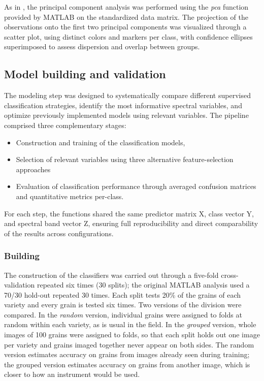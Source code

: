 \documentclass[final,5p,times,twocolumn]{elsarticle}
\newcommand{\added}[1]{{\color{blue}#1}}
\begin{document}
\added{As in} \citet{amigo2013,zhang2022,ali2024}\added{,} the principal component analysis was performed using the \emph{pca} function provided by MATLAB \added{on} the standardized data matrix.
The projection of the observations onto the first two principal components was visualized through a scatter plot, using distinct colors and markers per class, with confidence ellipses superimposed to assess dispersion and overlap between groups. 

\subsection{Model building and validation}

The modeling step was designed to systematically compare different supervised classification strategies, identify the most informative spectral variables, and optimize previously implemented models using relevant variables. 
The pipeline comprised three complementary stages: 
\begin{itemize}
    \item [i] Construction and training of the classification models, 
    \item [ii] Selection of relevant variables using three alternative feature-selection approaches 
    \item [iii] Evaluation of classification performance through averaged confusion matrices and quantitative metrics per-class. 
\end{itemize}

For each step, the functions shared the same predictor matrix X, class vector Y, and  spectral band vector Z, ensuring full reproducibility and direct comparability of the results across configurations.


\subsubsection{Building}\label{sec_building}

The construction of the classifiers was carried out through \added{a five-fold cross-validation repeated six times (30 splits); the original MATLAB analysis used a 70/30 hold-out repeated 30 times.}
\added{Each split tests 20\% of the grains of each variety and every grain is tested six times. Two versions of the division were compared. In the \emph{random} version, individual grains were assigned to folds at random within each variety, as is usual in the field. In the \emph{grouped} version, whole images of 100 grains were assigned to folds, so that each split holds out one image per variety and grains imaged together never appear on both sides. The random version estimates accuracy on grains from images already seen during training; the grouped version estimates accuracy on grains from another image, which is closer to how an instrument would be used.}
\end{document}
